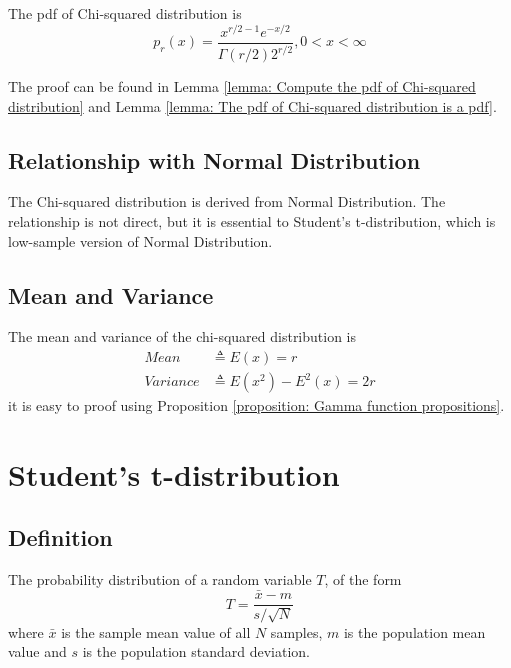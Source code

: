 \documentclass[a4paper]{article}
\begin{document}
The pdf of Chi-squared distribution is
\begin{equation}
    p_r(x) = \frac{x^{r/2-1} e^{-x/2}}{\Gamma(r/2) 2^{r/2}}, 0 < x < \infty
\end{equation}

The proof can be found in Lemma \ref{lemma: Compute the pdf of Chi-squared distribution} and Lemma \ref{lemma: The pdf of Chi-squared distribution is a pdf}.

\subsection{Relationship with Normal Distribution}

The Chi-squared distribution is derived from Normal Distribution.
The relationship is not direct, but it is essential to Student's t-distribution, which is low-sample version of Normal Distribution.

\subsection{Mean and Variance}

The mean and variance of the chi-squared distribution is
\begin{equation*}
    \begin{aligned}
        Mean     & \triangleq E(x) = r             \\
        Variance & \triangleq E(x^2) - E^2(x) = 2r
    \end{aligned}
\end{equation*}
it is easy to proof using Proposition \ref{proposition: Gamma function propositions}.

\newpage

\section{Student's t-distribution}

\subsection{Definition}

The probability distribution of a random variable $T$, of the form
\begin{equation*}
    T = \frac{\bar{x} - m}{s / \sqrt{N}}
\end{equation*}
where $\bar{x}$ is the sample mean value of all $N$ samples, $m$ is the population mean value and $s$ is the population standard deviation.
\end{document}
